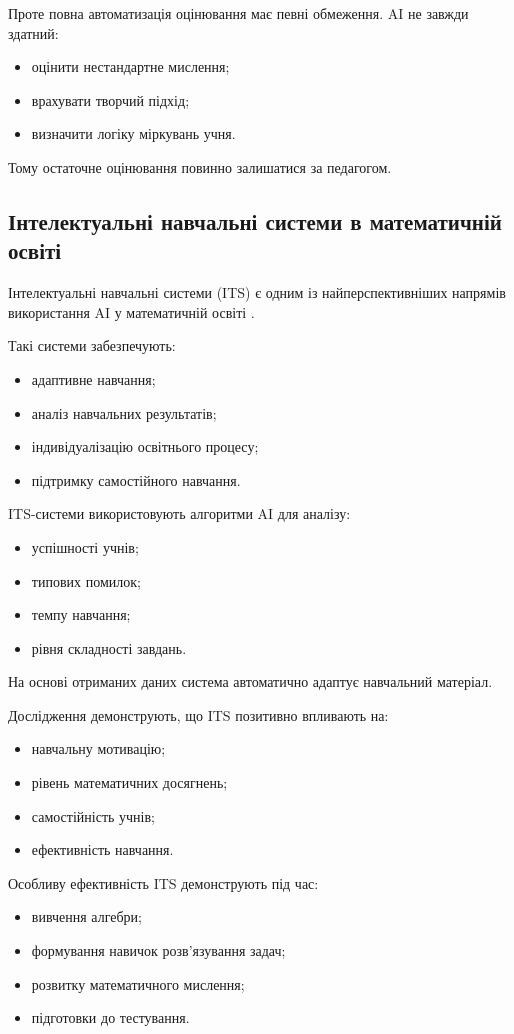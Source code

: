 Проте повна автоматизація оцінювання має певні обмеження. AI не завжди здатний:
\begin{itemize}
\item оцінити нестандартне мислення;
\item врахувати творчий підхід;
\item визначити логіку міркувань учня.
\end{itemize}

Тому остаточне оцінювання повинно залишатися за педагогом.

\subsection{Інтелектуальні навчальні системи в математичній освіті}

Інтелектуальні навчальні системи (ITS) є одним із найперспективніших напрямів використання AI у математичній освіті \cite{VillegasCh2025}.

Такі системи забезпечують:
\begin{itemize}
\item адаптивне навчання;
\item аналіз навчальних результатів;
\item індивідуалізацію освітнього процесу;
\item підтримку самостійного навчання.
\end{itemize}

ITS-системи використовують алгоритми AI для аналізу:
\begin{itemize}
\item успішності учнів;
\item типових помилок;
\item темпу навчання;
\item рівня складності завдань.
\end{itemize}

На основі отриманих даних система автоматично адаптує навчальний матеріал.

Дослідження \cite{Feng2025} демонструють, що ITS позитивно впливають на:
\begin{itemize}
\item навчальну мотивацію;
\item рівень математичних досягнень;
\item самостійність учнів;
\item ефективність навчання.
\end{itemize}

Особливу ефективність ITS демонструють під час:
\begin{itemize}
\item вивчення алгебри;
\item формування навичок розв’язування задач;
\item розвитку математичного мислення;
\item підготовки до тестування.
\end{itemize}

